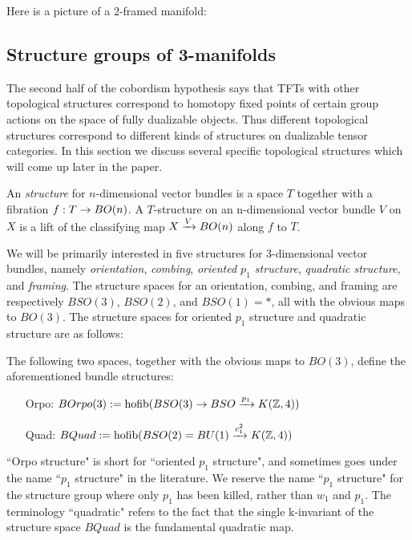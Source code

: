 \documentclass{amsart}
\begin{document}
\begin{example}
Here is a picture of a $2$-framed manifold: 
\end{example}

\subsection{Structure groups of 3-manifolds} \label{sec-lft-struc}

The second half of the cobordism hypothesis says that TFTs with other topological structures correspond to homotopy fixed points of certain group actions on the space of fully dualizable objects.  Thus different topological structures correspond to different kinds of structures on dualizable tensor categories.  In this section we discuss several specific topological structures which will come up later in the paper.

\begin{definition}
An \emph{structure} for $n$-dimensional vector bundles is a space $T$ together with a fibration $f: T \rightarrow BO(n)$.  A $T$-structure on an n-dimensional vector bundle $V$ on $X$ is a lift of the classifying map $X \xrightarrow{V} BO(n)$ along $f$ to $T$.
\end{definition}

We will be primarily interested in five structures for 3-dimensional vector bundles, namely \emph{orientation}, \emph{combing}, \emph{oriented $p_1$ structure}, \emph{quadratic structure}, and \emph{framing}.  The structure spaces for an orientation, combing, and framing are respectively $BSO(3)$, $BSO(2)$, and $BSO(1) = *$, all with the obvious maps to $BO(3)$.  The structure spaces for oriented $p_1$ structure and quadratic structure are as follows:
\begin{definition}
The following two spaces, together with the obvious maps to $BO(3)$, define the aforementioned bundle structures:
\begin{itemize}
\item[Orpo:] $BOrpo(3) := \operatorname{hofib}(BSO(3) \rightarrow BSO \xrightarrow{p_1} K(\mathbb Z,4))$
\item[Quad:] $BQuad := \operatorname{hofib}(BSO(2) = BU(1) \xrightarrow{c_1^2} K(\mathbb Z,4))$
\end{itemize}
\end{definition}

\begin{remark}
``Orpo structure" is short for ``oriented $p_1$ structure", and sometimes goes under the name ``$p_1$ structure" in the literature.  We reserve the name ``$p_1$ structure" for the structure group where only $p_1$ has been killed, rather than $w_1$ and $p_1$.  The terminology ``quadratic" refers to the fact that the single k-invariant of the structure space $BQuad$ is the fundamental quadratic map.
\end{remark}
\end{document}
